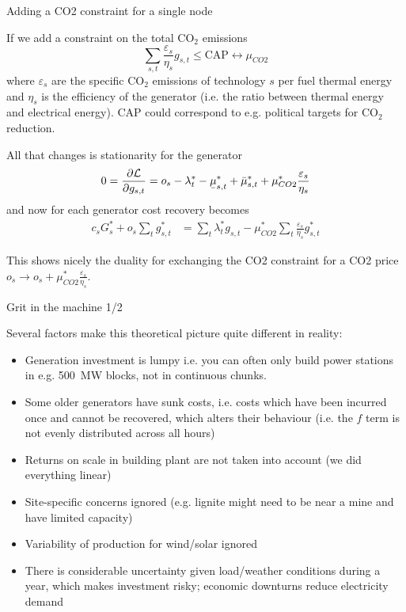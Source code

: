 \documentclass[10pt,dvipsnames]{beamer}
\def\l{\lambda}
\def\m{\mu}
\def\d{\partial}
\def\cL{\mathcal{L}}
\def\co2{CO${}_2$}
\newcommand{\ubar}[1]{\text{\b{$#1$}}}
\let\olditem\item
\renewcommand{\item}{%
\olditem\vspace{5pt}}
\begin{document}
\begin{frame}{Adding a CO2 constraint for a single node}

If we add a constraint on the total \co2 emissions
\begin{equation*}
  \sum_{s,t} \frac{\varepsilon_s}{\eta_{s}} g_{s,t} \leq \textrm{CAP}  \leftrightarrow \m_{CO2}
\end{equation*}
where $\varepsilon_s$ are the specific \co2 emissions of technology $s$ per fuel
thermal energy and $\eta_s$ is the efficiency of the generator
(i.e. the ratio between thermal energy and electrical energy). CAP
could correspond to e.g. political targets for \co2 reduction.

All that changes is stationarity for the generator
\begin{align*}
  0 =     \frac{\d \cL}{\d g_{s,t}} =   o_{s}-\l_t^* - \ubar{\m}^*_{s,t} + \bar{\m}^*_{s,t} + \m_{CO2}^* \frac{\varepsilon_s}{\eta_{s}}
\end{align*}
and now for each generator cost recovery becomes
\begin{align*}
  c_s G_s^* +  o_{s}\sum_{t} g_{s,t}^*
  & = \sum_{t} \l_t^* g_{s,t} -\m_{CO2}^* \sum_{t}  \frac{\varepsilon_s}{\eta_{s}} g_{s,t}^*
\end{align*}

This shows nicely the duality for exchanging the CO2 constraint for a CO2 price $o_{s} \to o_{s} + \m^*_{CO2} \frac{\varepsilon_s}{\eta_{s}} $.

\end{frame}




\begin{frame}{Grit in the machine 1/2}

  Several factors make this theoretical picture quite different in reality:
  \begin{itemize}
  \item Generation investment is \alert{lumpy} i.e. you can often only
    build power stations in e.g. 500~MW blocks, not in continuous chunks.
  \item Some older generators have \alert{sunk costs}, i.e. costs which have been incurred once and cannot be recovered, which alters their behaviour (i.e. the $f$ term is not evenly distributed across all hours)
  \item Returns on scale in building plant are not taken into account (we did everything linear)
  \item Site-specific concerns ignored (e.g. lignite might need to be near a mine and have limited capacity)
  \item Variability of production for wind/solar ignored
    \item There is considerable  uncertainty given load/weather conditions during a year, which makes investment risky; economic downturns reduce electricity demand
  \end{itemize}

\end{frame}
\end{document}
